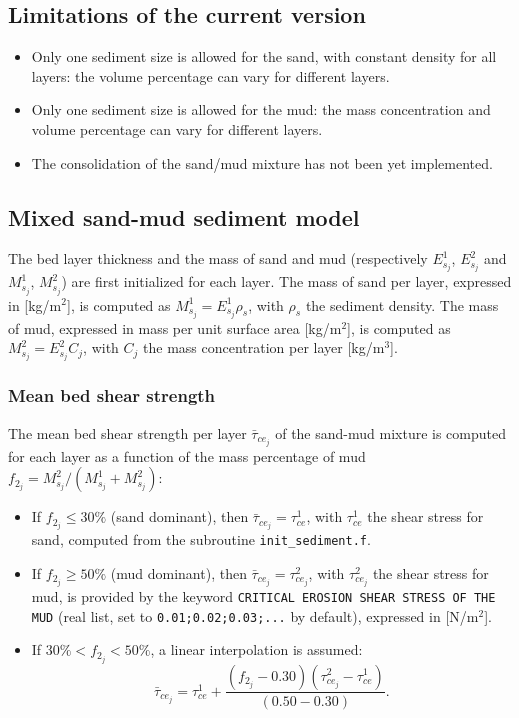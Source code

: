 \subsection{Limitations of the current version} 
\begin{itemize}
\item Only one sediment size is allowed for the sand, with constant density for all layers: the volume percentage can vary for different layers.
\item Only one sediment size is allowed for the mud: the mass concentration and volume percentage can vary for different layers.
\item The consolidation of the sand/mud mixture has not been yet implemented.
\end{itemize}

\subsection{Mixed sand-mud sediment model} 

The bed layer thickness and the mass of sand and mud (respectively $E_{s_j}^1$, $E_{s_j}^2$ and $M_{s_j}^1$, $M_{s_j}^2$) are first initialized for each layer. The mass of sand per layer, expressed in [kg/m$^2$], is computed as $M_{s_j}^1=E_{s_j}^1\rho_s$, with $\rho_s$ the sediment density. The mass of mud, expressed in mass per unit surface area [kg/m$^2$], is computed as $M_{s_j}^2=E_{s_j}^2 C_j$, with $C_j$ the mass concentration per layer [kg/m$^3$]. 

\subsubsection{Mean bed shear strength}
The mean bed shear strength per layer $\bar \tau_{ce_j}$ of the sand-mud mixture is computed for each layer as a function of the mass percentage of mud $f_{2_j}=M_{s_j}^2/(M_{s_j}^1+M_{s_j}^2)$:
\begin{itemize}
\item If $f_{2_j} \leq 30\%$ (sand dominant), then $\bar \tau_{ce_j} = \tau_{ce}^1$, with $\tau_{ce}^1$ the shear stress for sand, computed from the subroutine \texttt{init\_sediment.f}.
\item If $f_{2_j} \geq 50\%$ (mud dominant), then $\bar \tau_{ce_j} = \tau_{ce_j}^2$, with $\tau_{ce_j}^2$ the shear stress for mud, is provided by the keyword \texttt{CRITICAL EROSION SHEAR STRESS OF THE MUD} (real list, set to \texttt{0.01;0.02;0.03;...} by default), expressed in [N/m$^2$].
\item If $30\% < f_{2_j} < 50\%$, a linear interpolation is assumed:
\begin{equation}
\bar \tau_{ce_j} = \tau_{ce}^1 + \frac{(f_{2_j}-0.30)(\tau_{ce_j}^2-\tau_{ce}^1)}{(0.50-0.30)}.
\end{equation}
\end{itemize}

